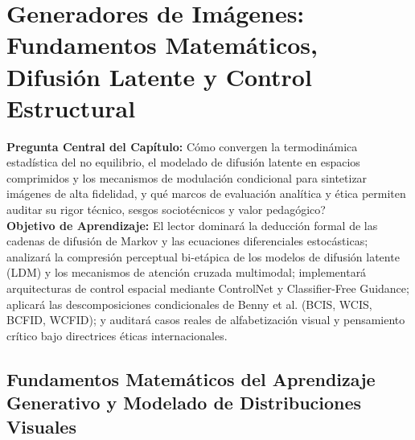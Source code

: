 \section[Generadores de Imágenes]{Generadores de Imágenes: Fundamentos Matemáticos, Difusión Latente y Control Estructural}

\begin{cajabeige}
\textbf{Pregunta Central del Capítulo:} \textquestiondown Cómo convergen la termodinámica estadística del no equilibrio, el modelado de difusión latente en espacios comprimidos y los mecanismos de modulación condicional para sintetizar imágenes de alta fidelidad, y qué marcos de evaluación analítica y ética permiten auditar su rigor técnico, sesgos sociotécnicos y valor pedagógico?\\[0.3cm]
\textbf{Objetivo de Aprendizaje:} El lector dominará la deducción formal de las cadenas de difusión de Markov y las ecuaciones diferenciales estocásticas; analizará la compresión perceptual bi-etápica de los modelos de difusión latente (LDM) y los mecanismos de atención cruzada multimodal; implementará arquitecturas de control espacial mediante ControlNet y Classifier-Free Guidance; aplicará las descomposiciones condicionales de Benny et al. (BCIS, WCIS, BCFID, WCFID); y auditará casos reales de alfabetización visual y pensamiento crítico bajo directrices éticas internacionales.
\end{cajabeige}


\vspace{0.4cm}

\subsection{Fundamentos Matemáticos del Aprendizaje Generativo y Modelado de Distribuciones Visuales}

